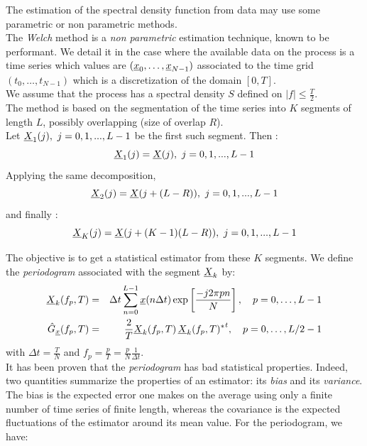 The estimation of the spectral density function from data may use some parametric or non parametric methods. \\
The \textit{Welch} method is a \emph{non parametric} estimation technique, known to be performant. We detail it in the case where the available data on the process is a time series which values are $({\underline{x}}_0, \dots,{\underline{x}}_{N-1})$ associated to the time grid $(t_0, \dots, t_{N-1})$ which is a discretization of the domain $[0,T]$.\\
We assume that the process has a spectral density $S$ defined on $| f | \leq \frac{T}{2}$.\\

The method is based on the segmentation of the time series into $K$ segments of length $L$, possibly overlapping (size of overlap $R$).\\
Let ${\underline{X}}_{1}(j), \ j = 0, 1,...,L-1$ be the first such segment. Then :
\begin{equation*}
  {\underline{X}}_{1}(j) = {\underline{X}}(j) , \ j = 0, 1,...,L-1
\end{equation*}
Applying the same decomposition,
\begin{equation*}
  {\underline{X}}_{2}(j) = {\underline{X}}(j + (L - R)) , \ j = 0, 1,...,L-1
\end{equation*}
and finally :
\begin{equation*}
  {\underline{X}}_{K}(j) = {\underline{X}}(j + (K-1)(L-R)) , \ j = 0, 1,...,L-1
\end{equation*}

The objective is to get a statistical estimator from these $K$ segments. We define the \emph{periodogram} associated with the segment ${\underline{X}}_k$ by:
\begin{eqnarray*}
  {\underline{X}}_{k}(f_p,T)&=&\Delta t\sum_{n=0}^{L-1}{\underline{x}}(n\Delta t)\exp\left[\frac{-j2\pi pn}{N}\right], \quad p=0,\dots, L-1\\
  \hat{G}_{{\underline{x}}}(f_p,T)&=&\frac{2}{T}{\underline{X}}_{k}(f_p,T)\,{{\underline{X}}_{k}(f_p,T)^*}^t,\quad p=0,\dots,L/2-1
\end{eqnarray*}
with $\Delta t=\frac{T}{N}$ and $f_p=\frac{p}{T}=\frac{p}{N}\frac{1}{\Delta t}$.\\

It has been proven that the \emph{periodogram} has bad statistical properties. Indeed, two quantities summarize the properties of an estimator:
its \emph{bias} and its \emph{variance}.
The bias is the expected error one makes on the average using only a finite number of time series of finite length, whereas the covariance is the expected fluctuations of
the estimator around its mean value. For the periodogram, we have:


